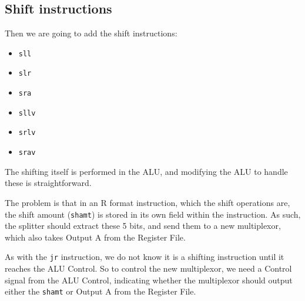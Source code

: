 \documentclass{beamer}
\begin{document}
\subsection{Shift instructions}
\begin{frame}
    Then we are going to add the shift instructions:
    \begin{itemize}
        \item \texttt{sll}
        \item \texttt{slr}
        \item \texttt{sra}
        \item \texttt{sllv}
        \item \texttt{srlv}
        \item \texttt{srav}
    \end{itemize}
\end{frame}
\begin{frame}
    The shifting itself is performed in the ALU, and modifying the ALU to
    handle these is straightforward.

    \vspace{\baselineskip}
    The problem is that in an R format instruction, which the shift operations
    are, the shift amount (\texttt{shamt}) is stored in its own field within
    the instruction. As such, the splitter should extract these 5 bits, and
    send them to a new multiplexor, which also takes Output A from the Register
    File.

    \vspace{\baselineskip}
    As with the \texttt{jr} instruction, we do not know it is a shifting
    instruction until it reaches the ALU Control. So to control the new
    multiplexor, we need a Control signal from the ALU Control, indicating
    whether the multiplexor should output either the \texttt{shamt} or Output A
    from the Register File.
\end{frame}
\end{document}
